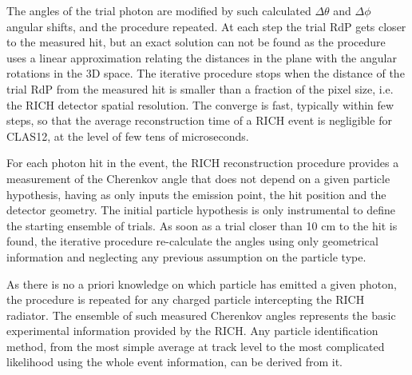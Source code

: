 The angles of the trial photon are modified by such calculated $\Delta\theta$ and $\Delta\phi$ angular shifts, and the procedure repeated. At each step the trial RdP gets closer to the measured hit, but an exact solution can not be found as the procedure uses a linear approximation relating the distances in the \MaPMT plane with the angular rotations in the 3D space. The iterative procedure stops when the distance of the trial RdP from the measured hit is smaller than a fraction of the \MaPMT pixel size, i.e. the RICH detector spatial resolution. The converge is fast, typically within few steps, so that the average reconstruction time of a RICH event is negligible for CLAS12, at the level of few tens of microseconds.

For each photon hit in the event, the RICH reconstruction procedure provides a measurement of the Cherenkov angle that does not depend on a given particle hypothesis, having as only inputs the emission point, the hit position and the detector geometry. The initial particle hypothesis is only instrumental to define the starting ensemble of trials. As soon as a trial closer than 10 cm to the hit is found, the iterative procedure re-calculate the angles using only geometrical information and neglecting any previous assumption on the particle type.

As there is no a priori knowledge on which particle has emitted a given photon, the procedure is repeated for any charged particle intercepting the RICH radiator. The ensemble of such measured Cherenkov angles represents the basic experimental information provided by the RICH. Any particle identification method, from the most simple average at track level to the most complicated likelihood using the whole event information, can be derived from it.
